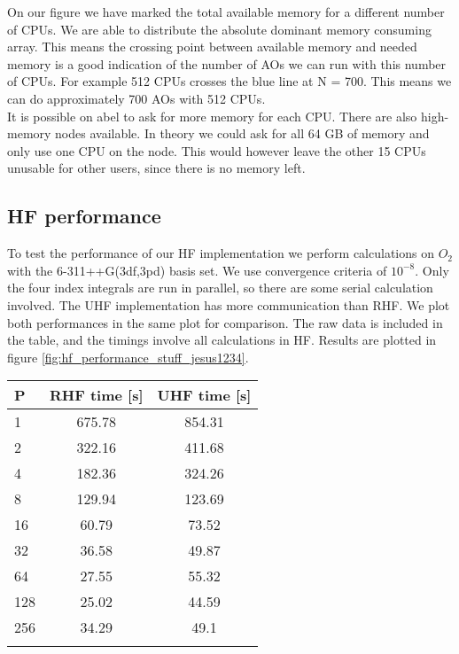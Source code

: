 On our figure we have marked the total available memory for a different number of CPUs. We are able to distribute the absolute dominant memory consuming array. This means the crossing point between available memory and needed memory is a good indication of the number of AOs we can run with this number of CPUs. For example 512 CPUs crosses the blue line at N = 700. This means we can do approximately 700 AOs with 512 CPUs. \\

It is possible on abel to ask for more memory for each CPU. There are also high-memory nodes available. In theory we could ask for all 64 GB of memory and only use one CPU on the node. This would however leave the other 15 CPUs unusable for other users, since there is no memory left. 

\subsection{HF performance}
To test the performance of our HF implementation we perform calculations on $O_2$ with the 6-311++G(3df,3pd) basis set. We use convergence criteria of $10^{-8}$. Only the four index integrals are run in parallel, so there are some serial calculation involved. The UHF implementation has more communication than RHF. We plot both performances in the same plot for comparison. The raw data is included in the table, and the timings involve all calculations in HF. Results are plotted in figure \ref{fig:hf_performance_stuff_jesus1234}.

\begin{center}
\begin{tabular}{ l c c }
	\hline
  	P & RHF time [s] & UHF time [s] \\ \hline
  	1 & 675.78 & 854.31 \\ 
  	2 & 322.16 & 411.68 \\ 
  	4 & 182.36 & 324.26 \\
  	8 & 129.94 & 123.69 \\ 
  	16 & 60.79 & 73.52 \\ 
  	32 & 36.58 & 49.87 \\ 
  	64 & 27.55 & 55.32 \\ 
  	128 & 25.02 & 44.59 \\
  	256 & 34.29 & 49.1  \\ \hline
  	\\
	\end{tabular}
\end{center}

